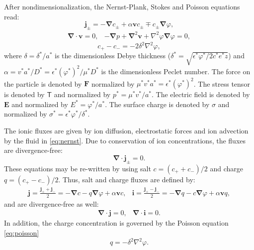 \documentclass[preprint,10pt]{elsarticle}
\newcommand\eps \epsilon
\newcommand\Laplacian{\nabla^2}
\newcommand\bnabla{\boldsymbol{\nabla}}
\newcommand\bLaplacian{\boldsymbol{\nabla}^2}
\newcommand\bv{\boldsymbol{v}}
\newcommand\bE{\boldsymbol{E}}
\newcommand\bj{\boldsymbol{j}}
\newcommand\bi{\boldsymbol{i}}
\newcommand\bF{\boldsymbol{F}}
\newcommand\tT{\mathsf{T}}
\begin{document}
After nondimensionalization, the Nernst-Plank, Stokes and Poisson equations read:
\begin{equation} \label{eq:nernst}
\bj_\pm = 
-\bnabla c_\pm + \alpha \bv c_\pm \mp c_\pm \bnabla \varphi,
\end{equation}
\begin{equation} \label{eq:stokes}
\begin{array}{cc}
\bnabla \cdot \bv = 0, &
-\bnabla p + \bLaplacian \bv + \Laplacian \varphi \bnabla \varphi = 0, 
\end{array}
\end{equation}
\begin{equation} \label{eq:poisson}
c_+ - c_- = -2\delta^2 \Laplacian \varphi,
\end{equation}
where $\delta = {\delta^*}/{a^*}$ is the dimensionless Debye thickness 
($\delta^* = \sqrt{{\eps^* \varphi^*}/{2 c^* e^* z}}$) and 
$\alpha = {v^* a^*}/{D^*} = {\eps^* (\varphi^*)^2}/{\mu^* D^*}$ 
is the dimensionless Peclet number.
The force on the particle is denoted by $\bF$ normalized by $\mu^* v^* a^* = \eps^* (\varphi^*)^2$.
The stress tensor is denoted by $\tT$ and normalized by $p^* = \mu^* v^* / a^*$.
The electric field is denoted by $\bE$ and normalized by $E^* = \varphi^* / a^*$.
The surface charge is denoted by $\sigma$ and normalized by $\sigma^* = \eps^* \varphi^* / \delta^*$.

The ionic fluxes are given by ion diffusion, electrostatic forces and ion advection by the fluid
in \eqref{eq:nernst}. Due to conservation of ion concentrations, the fluxes are divergence-free:
\begin{equation*}
\bnabla \cdot \bj_\pm = 0.
\end{equation*}
These equations may be re-written by using salt $c = (c_+ + c_-)/2$ and charge $q = (c_+ - c_-)/2$.
Thus, salt and charge fluxes are defined by:
\begin{equation}\label{eq:fluxes}\begin{array}{cc}
  \bj = \frac{\bj_+ + \bj_-}{2} = -\bnabla c - q \bnabla \varphi + \alpha \bv c, & 
  \bi = \frac{\bj_+ - \bj_-}{2} = -\bnabla q - c \bnabla \varphi + \alpha \bv q,
\end{array}\end{equation}
and are divergence-free as well:
\begin{equation}\label{eq:zero_flux}\begin{array}{cc}
\bnabla \cdot \bj = 0, & 
\bnabla \cdot \bi = 0. 
\end{array}\end{equation}
In addition, the charge concentration is governed by the Poisson equation \eqref{eq:poisson}
\begin{equation}
q = -\delta^2 \Laplacian \varphi.
\end{equation}
\end{document}

